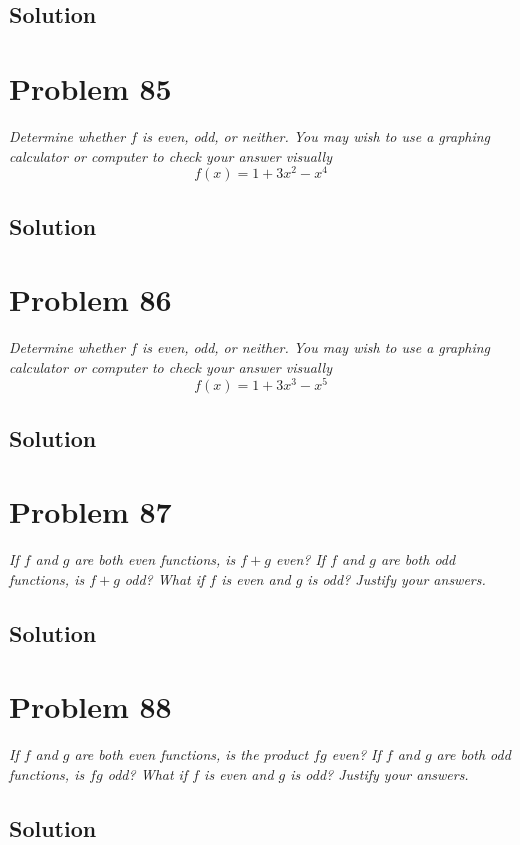 \documentclass[11pt]{article}
\newcommand{\soln}{\subsection*}
\newcommand{\qn}{\textit}
\begin{document}
\soln{Solution}

\section*{Problem 85}

\qn{Determine whether $f$ is even, odd, or neither. You may wish to use a graphing calculator or computer to check your answer visually $$f(x)=1+3x^2-x^4$$}

\soln{Solution}

\section*{Problem 86}

\qn{Determine whether $f$ is even, odd, or neither. You may wish to use a graphing calculator or computer to check your answer visually $$f(x)=1+3x^3-x^5$$}

\soln{Solution}

\section*{Problem 87}

\qn{If $f$ and $g$ are both even functions, is $f+g$ even? If $f$ and $g$ are both odd functions, is $f+g$ odd? What if $f$ is even and $g$ is odd? Justify your answers.}

\soln{Solution}

\section*{Problem 88}

\qn{If $f$ and $g$ are both even functions, is the product $fg$ even? If $f$ and $g$ are both odd functions, is $fg$ odd? What if $f$ is even and $g$ is odd? Justify your answers.}

\soln{Solution}
\end{document}
